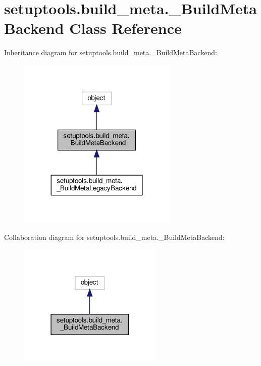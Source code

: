 \hypertarget{classsetuptools_1_1build__meta_1_1__BuildMetaBackend}{}\section{setuptools.\+build\+\_\+meta.\+\_\+\+Build\+Meta\+Backend Class Reference}
\label{classsetuptools_1_1build__meta_1_1__BuildMetaBackend}


Inheritance diagram for setuptools.\+build\+\_\+meta.\+\_\+\+Build\+Meta\+Backend\+:
\nopagebreak
\begin{figure}[H]
\begin{center}
\leavevmode
\includegraphics[width=215pt]{classsetuptools_1_1build__meta_1_1__BuildMetaBackend__inherit__graph}
\end{center}
\end{figure}


Collaboration diagram for setuptools.\+build\+\_\+meta.\+\_\+\+Build\+Meta\+Backend\+:
\nopagebreak
\begin{figure}[H]
\begin{center}
\leavevmode
\includegraphics[width=195pt]{classsetuptools_1_1build__meta_1_1__BuildMetaBackend__coll__graph}
\end{center}
\end{figure}
